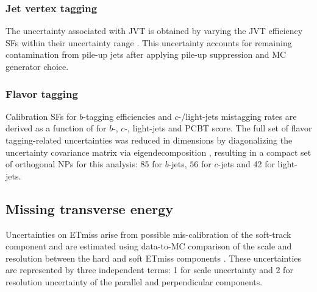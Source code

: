 \documentclass[../thesis.tex]{subfiles}
\begin{document}
\subsubsection*{Jet vertex tagging}
The uncertainty associated with \acs{JVT} is obtained by varying the \acs{JVT} efficiency \acs{SF}s within their uncertainty range \citep{syst:jvt_calib}. This uncertainty accounts for remaining contamination from pile-up jets after applying pile-up suppression and \acs{MC} generator choice.

\subsubsection*{Flavor tagging}
Calibration \acs{SF}s for $b$-tagging efficiencies and $c$-/light-jets mistagging rates are derived as a function of \pT for $b$-, $c$-, light-jets and \acs{PCBT} score. The full set of flavor tagging-related uncertainties was reduced in dimensions by diagonalizing the uncertainty covariance matrix via eigendecomposition \citep{ftag:calib}, resulting in a compact set of orthogonal \acs{NP}s for this analysis: 85 for $b$-jets, $56$ for $c$-jets and 42 for light-jets.

\subsection{Missing transverse energy}
Uncertainties on \acs{ETmiss} arise from possible mis-calibration of the soft-track component and are estimated using data-to-\acs{MC} comparison of the \pT scale and resolution between the hard and soft \acs{ETmiss} components \citep{reco:met}. These uncertainties are represented by three independent terms: 1 for scale uncertainty and 2 for resolution uncertainty of the parallel and perpendicular components.

\end{document}
